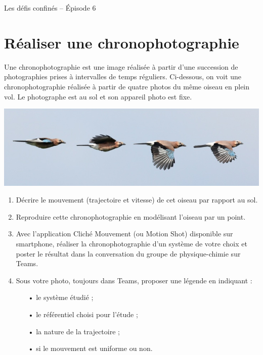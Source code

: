 \documentclass[12pt,a4paper]{article}
\begin{document}
\begin{header}
Les défis confinés -- Épisode 6 
\end{header}

\section*{Réaliser une chronophotographie}

Une chronophotographie est une image réalisée à partir d'une succession de photographies prises à intervalles de temps réguliers.
Ci-dessous, on voit une chronophotographie réalisée à partir de quatre photos du même oiseau en plein vol.
Le photographe est au sol et son appareil photo est fixe.

\begin{center}
\includegraphics[width=\textwidth]{images/chrono_bird.png}
\end{center}

\begin{enumerate}
\item Décrire le mouvement (trajectoire et vitesse) de cet oiseau par rapport au sol.

\item Reproduire cette chronophotographie en modélisant l'oiseau par un point.

\item Avec l'application Cliché Mouvement (ou Motion Shot) disponible sur smartphone, réaliser la chronophotographie d'un système de votre choix et poster le résultat dans la conversation du groupe de physique-chimie sur Teams.

\item Sous votre photo, toujours dans Teams, proposer une légende en indiquant :
\begin{itemize}
\item[•] le système étudié ;
\item[•] le référentiel choisi pour l'étude ;
\item[•] la nature de la trajectoire ;
\item[•] si le mouvement est uniforme ou non.
\end{itemize}
\end{enumerate}
\end{document}
